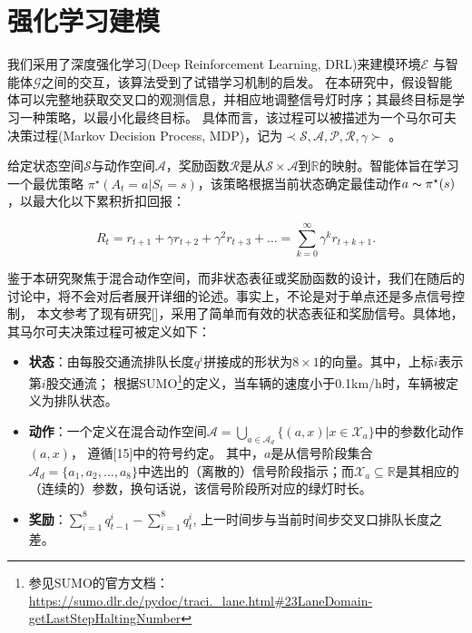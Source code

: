 \section{强化学习建模}
我们采用了深度强化学习(Deep Reinforcement Learning, DRL)来建模环境$\mathcal{E}$ 与智能体$\mathcal{G}$之间的交互，该算法受到了试错学习机制的启发。
在本研究中，假设智能体可以完整地获取交叉口的观测信息，并相应地调整信号灯时序；其最终目标是学习一种策略，以最小化最终目标。
具体而言，该过程可以被描述为一个马尔可夫决策过程(Markov Decision Process, MDP)，记为$\prec \mathcal{S}, \mathcal{A}, \mathcal{P}, \mathcal{R}, \gamma\succ$ 。

给定状态空间$\mathcal{S}$与动作空间$\mathcal{A}$，奖励函数$\mathcal{R}$是从$\mathcal{S} \times \mathcal{A}$到$\mathbb{R}$的映射。智能体旨在学习一个最优策略
$\pi^\star(A_t = a | S_t = s)$，该策略根据当前状态确定最佳动作$a\thicksim\pi^\star(s)$，以最大化以下累积折扣回报：

\begin{equation}
    R_t = r_{t+1} + \gamma r_{t+2} + \gamma^2 r_{t+3} + \ldots = \sum_{k=0}^{\infty} \gamma^k r_{t+k+1}.
    \label{eq:total_discounted_return}
\end{equation}

鉴于本研究聚焦于混合动作空间，而非状态表征或奖励函数的设计，我们在随后的讨论中，将不会对后者展开详细的论述。事实上，不论是对于单点还是多点信号控制，
本文参考了现有研究[]，采用了简单而有效的状态表征和奖励信号。具体地，其马尔可夫决策过程可被定义如下：


\begin{itemize}[leftmargin=*]
    \setlength{\itemsep}{0pt}
    \setlength{\parsep}{0pt}
    \setlength{\parskip}{0pt}

    
    \item \textbf{状态}：由每股交通流排队长度$q^{i}$拼接成的形状为$8\times1$的向量。其中，上标$i$表示第$i$股交通流；
    根据SUMO\footnote{参见SUMO的官方文档：\url{https://sumo.dlr.de/pydoc/traci._lane.html\#23LaneDomain-getLastStepHaltingNumber}}的定义，当车辆的速度小于0.1km/h时，车辆被定义为排队状态。
    \item \textbf{动作}：一个定义在混合动作空间$\mathcal{A}=\bigcup_{a\in\mathcal{A}_{d}}\{(a, x)|x\in\mathcal{X}_{a} \} $中的参数化动作$(a, x)$， 遵循[15]中的符号约定。
    其中，$a$是从信号阶段集合$\mathcal{A}_{d}=\{ a_{1}, a_{2}, ..., a_{8}\} $中选出的（离散的）信号阶段指示；而$\mathcal{X}_{a}\subseteq \mathbb{R} $是其相应的（连续的）参数，换句话说，该信号阶段所对应的绿灯时长。
    \item \textbf{奖励}：$\sum_{i=1}^{8} q^i_{t-1} - \sum_{i=1}^{8} q^i_{t}$, 上一时间步与当前时间步交叉口排队长度之差。
    
\end{itemize}

